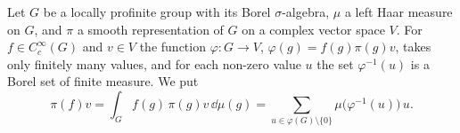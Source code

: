 Let $G$ be a locally profinite group with its Borel $\sigma$-algebra, $\mu$ a left Haar measure on $G$, and $\pi$ a
smooth representation of $G$ on a complex vector space $V$. For $f\in C_c^\infty(G)$ and $v\in V$ the function
$\varphi\colon G\to V$, $\varphi(g)=f(g)\pi(g)v$, takes only finitely many values, and for each non-zero value $u$ the
set $\varphi^{-1}(u)$ is a Borel set of finite measure. We put
\[
  \pi(f)v=\int_Gf(g)\,\pi(g)v\,\dd\mu(g)=\sum_{u\in\varphi(G)\setminus\{0\}}\mu\bigl(\varphi^{-1}(u)\bigr)\,u .
\]
